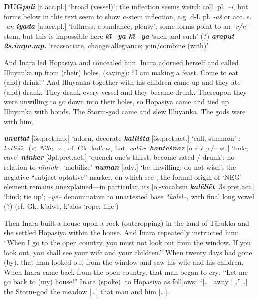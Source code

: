 \documentclass[10pt]{article}
\newcommand{\subsc}[1]{$_{\textrm{\scriptsize{#1}}}$}	%
\newcommand{\bit}[1]{\textbf{\textit{#1}}}				%
\newcommand{\p}[1]{{\tiny[{#1}]}}					%
\newcommand{\palk}{\textroundcap{k}}						%
\newcommand{\hi}{h\subsc{1}}								%
\newcommand{\I}{\={\i}}									%
\newcommand{\pr}{\'{ }}									%
\newcommand{\hith}{\textsubwedge{h}}
\renewcommand{\.}[1]{\textsubdot{#1}}
\begin{document}
\begin{description}
\begin{notes}
\textbf{DUG}\bit{pal{\hith}i} \p{n.acc.pl.} `broad (vessel)'; the inflection seems weird: coll. pl. \textit{--i}, but forms below in this text seem to show \textit{a-}stem inflection, e.g. d-l. pl. \textit{-a\v{s}} or acc. s. \textit{-an} \bit{iyada} \p{n.acc.pl.} `fullness; abundance, plenty'; some forms point to an \textit{-r/n-} stem, but this is impossible here \bit{k{\I}=ya k{\I}=ya} `such-and-such' (?) \bit{{\hith}arap{\hith}ut} \bit{2s.impv.mp.} `reassociate, change allegiance; join/combine (with)' 

\end{notes}

\item[B i 3{\pr}--18{\pr} :] And Inara led H\=opasiya and concealed him. Inara adorned herself and called Illuyanka up from (their) holes, (saying): ``I am making a feast. Come to eat (and) drink!'' And Illuyanka together with his children came up and they ate (and) drank. They drank every vessel and they became drunk. Thereupon they were unwilling to go down into their holes, so H\=opasiya came and tied up Illuyanka with bonds. The Storm-god came and slew Illuyanka. The gods were with him.


\begin{notes}

\bit{unuttat} \p{3s.pret.mp.} `adorn, decorate \bit{kalli\v{s}ta} \p{3s.pret.act.} `call; summon' : \textit{kalli\v{s}\v{s}--} (< \textit{*{\palk}\'el{\hi}-s--}; cf. Gk. {\greektext kal'ew}, Lat. \textit{cal\=are} \bit{hante\v{s}naz} \p{n.abl.;r/n-st.} `hole; cave' \bit{nink\=er} \p{3pl.pret.act.} `quench one's thirst; become sated / drunk'; no relation to \textit{n{\I}nink--} `mobilize' \bit{n\=uman} \p{adv.} `be unwilling; do not wish'; the negative ``subject-optative'' marker, on which see ; the formal origin of `NEG' element remains unexplained---in particular, its [\=o]-vocalism \bit{kal\=eli\=et} \p{3s.pret.act.} `bind; tie up'; \textit{--y\'e--} denominative to unattested base \textit{*kal\=el--}, with final long vowel (?) (cf. Gk. {\greektext k'alws, k'alos} `rope; line')

\end{notes}

\item[C i 14{\pr}--A ii 14{\pr} :] Then Inara built a house upon a rock (outcropping) in the land of T\=arukka and she settled H\=opasiya within the house. And Inara repeatedly instructed him: ``When I go to the open country, you must not look out from the window. If you look out, you shall see your wife and your children.'' When twenty days had gone (by), that man looked out from the window and saw his wife and his children. When Inara came back from the open country, that man began to cry: ``Let me go back to (my) house!'' Inara (spoke) [to H\=opasiya as foll]ows: ``[{\ldots}] away [{\ldots}''{\ldots}] the Storm-god the meadow [{\ldots}] that man and him [{\ldots}].




\end{description}
\end{document}
